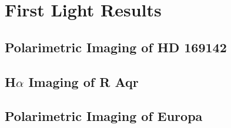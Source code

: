 \section{First Light Results}\label{sec:firstlight}

\subsection{Polarimetric Imaging of HD 169142\label{sec:hd169142}}

\subsection{H$\alpha$ Imaging of R Aqr\label{sec:raqr}}

\subsection{Polarimetric Imaging of Europa\label{sec:europa}}
